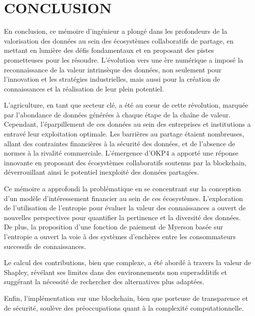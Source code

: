 \chapter*{CONCLUSION}
\thispagestyle{plain}

En conclusion, ce mémoire d'ingénieur a plongé dans les profondeurs de la valorisation des données au sein des écosystèmes collaboratifs de partage, en mettant en lumière des défis fondamentaux et en proposant des pistes prometteuses pour les résoudre. L'évolution vers une ère numérique a imposé la reconnaissance de la valeur intrinsèque des données, non seulement pour l'innovation et les stratégies industrielles, mais aussi pour la création de connaissances et la réalisation de leur plein potentiel.

L'agriculture, en tant que secteur clé, a été au cœur de cette révolution, marquée par l'abondance de données générées à chaque étape de la chaîne de valeur. Cependant, l'éparpillement de ces données au sein des entreprises et institutions a entravé leur exploitation optimale. Les barrières au partage étaient nombreuses, allant des contraintes financières à la sécurité des données, et de l'absence de normes à la rivalité commerciale. L'émergence d'OKP4 a apporté une réponse innovante en proposant des écosystèmes collaboratifs soutenus par la blockchain, déverrouillant ainsi le potentiel inexploité des données partagées.

Ce mémoire a approfondi la problématique en se concentrant sur la conception d'un modèle d'intéressement financier au sein de ces écosystèmes. L'exploration de l'utilisation de l'entropie pour évaluer la valeur des connaissances a ouvert de nouvelles perspectives pour quantifier la pertinence et la diversité des données. De plus, la proposition d'une fonction de paiement de Myerson basée sur l'entropie a ouvert la voie à des systèmes d'enchères entre les consommateurs successifs de connaissances.

Le calcul des contributions, bien que complexe, a été abordé à travers la valeur de Shapley, révélant ses limites dans des environnements non superadditifs et suggérant la nécessité de rechercher des alternatives plus adaptées.

Enfin, l'implémentation sur une blockchain, bien que porteuse de transparence et de sécurité, soulève des préoccupations quant à la complexité computationnelle.

\newpage
\thispagestyle{empty}
\null
\newpage